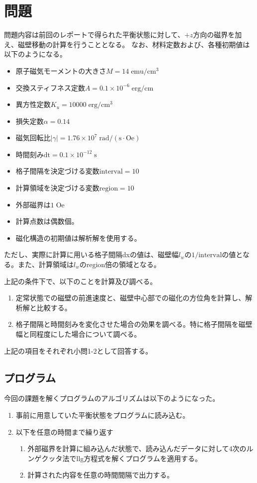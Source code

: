 \documentclass{jsarticle}
\begin{document}
\section{問題}
問題内容は前回のレポートで得られた平衡状態に対して、$+z$方向の磁界を加え、磁壁移動の計算を行うこととなる。
なお、材料定数および、各種初期値は以下のようになる。
\begin{itemize}
	\item 原子磁気モーメントの大きさ$M = 14\;\mathrm{emu/cm^3}$
	\item 交換スティフネス定数$A = 0.1\times 10^{-6}\;\mathrm{erg/cm}$
	\item 異方性定数$K_u = 10000\;\mathrm{erg/cm^3}$
	\item 損失定数$\alpha = 0.14$
	\item 磁気回転比$\lvert\gamma\rvert = 1.76\times 10^7\;\mathrm{rad/(s\cdot Oe)}$
	\item 時間刻み$\mathrm{dt} = 0.1\times 10^{-12}\;\mathrm{s}$
	\item 格子間隔を決定づける変数$\mathrm{interval} = 10$
	\item 計算領域を決定づける変数$\mathrm{region} = 10$
	\item 外部磁界は$1\;\mathrm{Oe}$
	\item 計算点数は偶数個。
	\item 磁化構造の初期値は解析解を使用する。
\end{itemize}

ただし、実際に計算に用いる格子間隔dxの値は、磁壁幅$l_w$の$1/\mathrm{interval}$の値となる。また、計算領域は$l_w$のregion倍の領域となる。

上記の条件下で、以下のことを計算及び調べる。
\begin{enumerate}
	\item 定常状態での磁壁の前進速度と、磁壁中心部での磁化の方位角を計算し、解析解と比較する。
	\item 格子間隔と時間刻みを変化させた場合の効果を調べる。特に格子間隔を磁壁幅と同程度にした場合について調べる。
\end{enumerate}

上記の項目をそれぞれ小問1-2として回答する。

\subsection{プログラム}
今回の課題を解くプログラムのアルゴリズムは以下のようになった。
\begin{enumerate}
	\item 事前に用意していた平衡状態をプログラムに読み込む。
	\item 以下を任意の時間まで繰り返す
	\begin{enumerate}
		\item 外部磁界を計算に組み込んだ状態で、読み込んだデータに対して4次のルンゲクッタ法でllg方程式を解くプログラムを適用する。
		\item 計算された内容を任意の時間間隔で出力する。
	\end{enumerate}
\end{enumerate}
\end{document}
